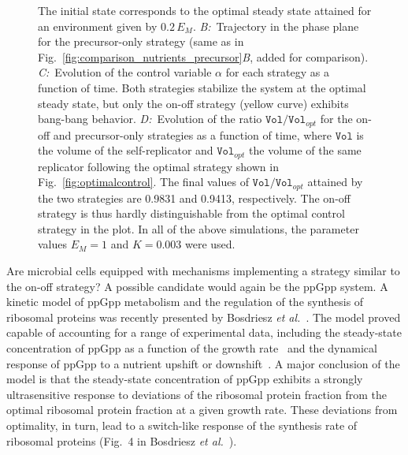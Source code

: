 \begin{figure}
{The initial state corresponds to the optimal steady state attained for an environment given by $0.2 \, E_M$.
\textit{B:}~Trajectory in the phase plane for the precursor-only strategy (same as in Fig.~\ref{fig:comparison_nutrients_precursor}\textit{B}, added for comparison).
\textit{C:}~Evolution of the control variable $\alpha$ for each strategy as a function of time.
Both strategies stabilize the system at the optimal steady state, but only the on-off strategy (yellow curve) exhibits bang-bang behavior.
\textit{D:}~Evolution of the ratio $\texttt{Vol} / \texttt{Vol}_{opt}$ for the on-off and precursor-only strategies as a function of time, where $\texttt{Vol}$ is the volume of the self-replicator and $\texttt{Vol}_{opt}$ the volume of the same replicator following the optimal strategy shown in Fig.~\ref{fig:optimalcontrol}.
The final values of $\texttt{Vol} / \texttt{Vol}_{opt}$ attained by the two strategies are 0.9831 and 0.9413, respectively.
The on-off strategy is thus hardly distinguishable from the optimal control strategy in the plot.
In all of the above simulations, the parameter values $E_M=1$ and $K=0.003$ were used.
}
\label{fig:onoffresults}
\end{figure}

Are microbial cells equipped with mechanisms implementing a strategy similar to the on-off strategy?
A possible candidate would again be the ppGpp system.
A kinetic model of ppGpp metabolism and the regulation of the synthesis of ribosomal proteins was recently presented by Bosdriesz \textit{et al.}~\cite{bosdriesz_how_2015}.
The model proved capable of accounting for a range of experimental data, including the steady-state concentration of ppGpp as a function of the growth rate~\cite{bremer_modulation_1996} and the dynamical response of ppGpp to a nutrient upshift or downshift~\cite{murray_control_2003}.
A major conclusion of the model is that the steady-state concentration of ppGpp exhibits a strongly ultrasensitive response to deviations of the ribosomal protein fraction from the optimal ribosomal protein fraction at a given growth rate. 
These deviations from optimality, in turn, lead to a switch-like response of the synthesis rate of ribosomal proteins (Fig.~4 in Bosdriesz \textit{et al.}~\cite{bosdriesz_how_2015}).

